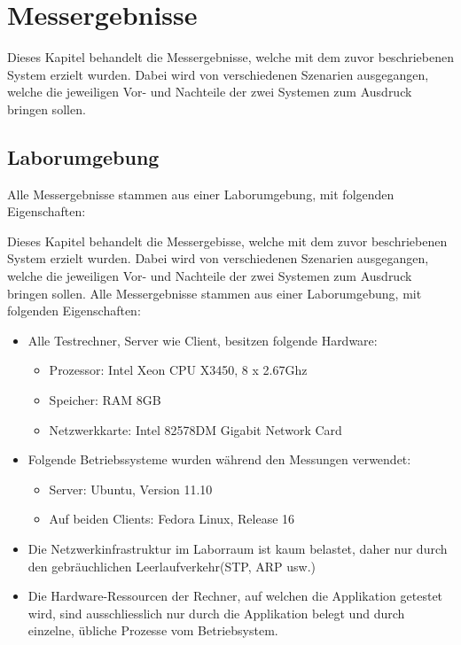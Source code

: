 \chapter{Messergebnisse}

Dieses Kapitel be\-han\-delt die Mess\-er\-geb\-nis\-se, welche mit dem zu\-vor be\-schrie\-be\-nen System erzielt wurden. Dabei wird von verschiedenen Sze\-narien aus\-ge\-gang\-en, welche die jeweiligen Vor- und Nach\-teile der zwei Sy\-stem\-en zum Ausdruck bringen sollen. 

\section{Laborumgebung}

Alle Messergebnisse stammen aus einer La\-bor\-um\-gebung, mit fol\-gen\-den Ei\-gen\-schaf\-ten:

Dieses Kapitel be\-handelt die Mes\-ser\-ge\-bis\-se, welche mit dem zuvor be\-schrie\-benen System erzielt wurden. Dabei wird von verschiedenen Szenarien ausgegangen, welche die jeweiligen Vor- und Nachteile der zwei Systemen zum Ausdruck bringen sollen. \newline
Alle Mes\-ser\-ge\-bnis\-se stam\-men aus einer Labor\-umgebung, mit folgenden Ei\-gen\-schaf\-ten:

\begin{itemize}
\item Alle Testrechner, Server wie Client, besitzen folgende Hardware:
\begin{itemize}
\item Prozessor: Intel Xeon CPU X3450, 8 x 2.67Ghz
\item Speicher: RAM 8GB
\item Netzwerkkarte: Intel 82578DM Gigabit Network Card
\end{itemize}
\item Folgende Betriebssysteme wurden während den Messungen verwendet:
\begin{itemize}
\item Server: Ubuntu, Version 11.10
\item Auf beiden Clients: Fedora Linux, Release 16
\end{itemize}
\item Die Netzwerkinfrastruktur im Laborraum ist kaum belastet, daher nur durch den gebräuchlichen Leerlaufverkehr(STP, ARP usw.)
\item Die Hardware-Ressourcen der Rechner, auf welchen die Applikation getestet wird, sind ausschliesslich nur durch die Applikation belegt und durch einzelne, übliche Prozesse vom  Betriebsystem.
\end{itemize}

